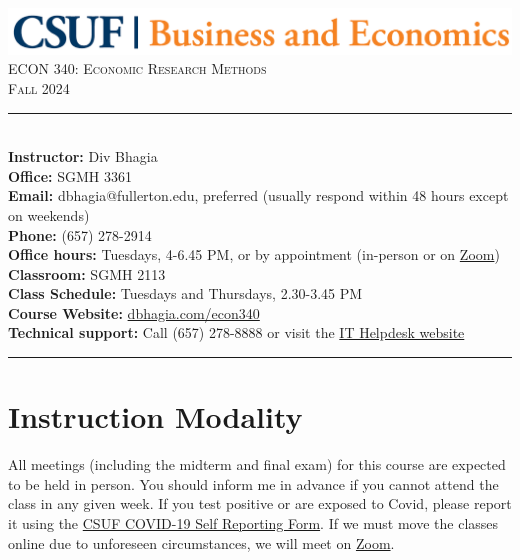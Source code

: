 \documentclass{syllabus}
\begin{document}
\begin{center}
\includegraphics[scale=0.22]{CBE-Wordmark-CMYK} \\ \vspace{0.5em}
{\large \textsc{ECON 340: Economic Research Methods}} \\
{\large \textsc{Fall 2024}}
\end{center}

\begin{center}
\begin{minipage}[t]{\textwidth}
\rule{\textwidth}{0.5pt} \\
\textbf{Instructor:} Div Bhagia \\
\textbf{Office:} SGMH 3361 \\
\textbf{Email:} dbhagia@fullerton.edu, preferred (usually respond within 48 hours except on weekends) \\
\textbf{Phone:} (657) 278-2914 \\
\textbf{Office hours:} Tuesdays, 4-6.45 PM, or by appointment (in-person or on \href{https://fullerton.zoom.us/j/81895171931}{Zoom}) \\
\textbf{Classroom:} SGMH 2113 \\
\textbf{Class Schedule:} Tuesdays and Thursdays, 2.30-3.45 PM \\
\textbf{Course Website:} \href{https://dbhagia.com/econ340}{dbhagia.com/econ340} \\
\textbf{Technical support:} Call (657) 278-8888 or visit the \href{https://www.fullerton.edu/it/students/helpdesk/index.php}{IT Helpdesk website} \\
\rule{\textwidth}{0.5pt} 
\end{minipage}
\end{center}

\vspace{0.35cm}
\section*{Instruction Modality}
All meetings (including the midterm and final exam) for this course are expected to be held in person. You should inform me in advance if you cannot attend the class in any given week. If you test positive or are exposed to Covid, please report it using the \href{https://coronavirus.fullerton.edu/report-covid-19-case-or-exposure/}{CSUF COVID-19 Self Reporting Form}. If we must move the classes online due to unforeseen circumstances, we will meet on \href{https://fullerton.zoom.us/j/81895171931}{Zoom}.
\end{document}
